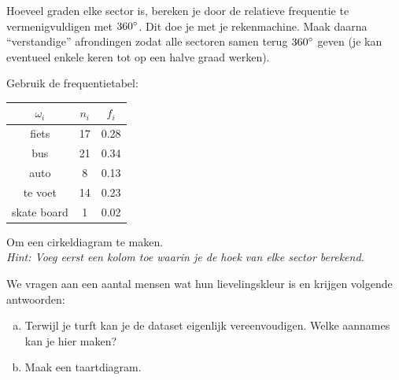 \documentclass[12pt,twoside,a4paper]{article}
\begin{document}
Hoeveel graden elke sector is, bereken je door de relatieve frequentie te vermenigvuldigen met $360^\circ$. Dit doe je met je rekenmachine. Maak daarna “verstandige” afrondingen zodat alle sectoren samen terug $360^\circ$ geven (je kan eventueel enkele keren tot op een halve graad werken).

\begin{oefening}
Gebruik de frequentietabel:
\begin{center}
  \begin{tabular}{c|c|c}
    $\omega_i$ & $n_i$ & $f_i$\\
    \hline
    fiets      & 17    & 0.28\\
    bus        & 21    & 0.34\\
    auto       &  8    & 0.13\\
    te voet    & 14    & 0.23\\
    skate board&  1    & 0.02\\
  \end{tabular}
\end{center}
Om een cirkeldiagram te maken.\\
{\em Hint: Voeg eerst een kolom toe waarin je de hoek van elke sector berekend.}
\end{oefening}

\begin{oefening}
We vragen aan een aantal mensen wat hun lievelingskleur is en krijgen volgende antwoorden:
\begin{enumerate}[(a)]
\item Terwijl je turft kan je de dataset eigenlijk vereenvoudigen. Welke aannames kan je hier maken?
\item Maak een taartdiagram.
\end{enumerate}
\end{oefening}
\end{document}
